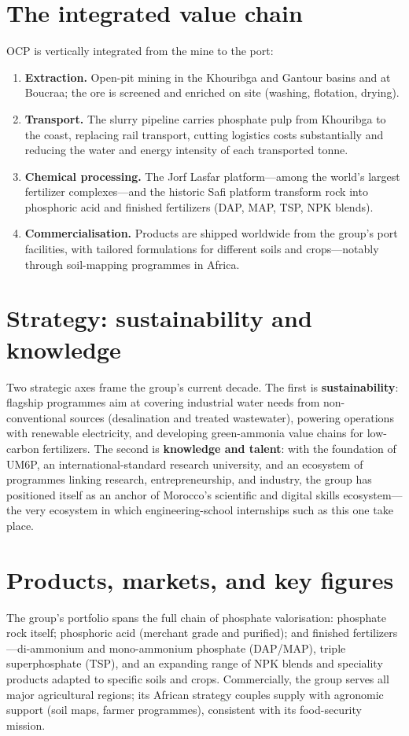 \documentclass[11pt,a4paper]{report}
\begin{document}
\section{The integrated value chain}
OCP is vertically integrated from the mine to the port:
\begin{enumerate}[nosep,leftmargin=1.6em]
  \item \textbf{Extraction.} Open-pit mining in the Khouribga and Gantour
  basins and at Boucraa; the ore is screened and enriched on site
  (washing, flotation, drying).
  \item \textbf{Transport.} The slurry pipeline carries phosphate pulp from
  Khouribga to the coast, replacing rail transport, cutting logistics costs
  substantially and reducing the water and energy intensity of each
  transported tonne.
  \item \textbf{Chemical processing.} The Jorf Lasfar platform---among the
  world's largest fertilizer complexes---and the historic Safi platform
  transform rock into phosphoric acid and finished fertilizers (DAP, MAP,
  TSP, NPK blends).
  \item \textbf{Commercialisation.} Products are shipped worldwide from the
  group's port facilities, with tailored formulations for different soils
  and crops---notably through soil-mapping programmes in Africa.
\end{enumerate}

\section{Strategy: sustainability and knowledge}
Two strategic axes frame the group's current decade. The first is
\textbf{sustainability}: flagship programmes aim at covering industrial
water needs from non-conventional sources (desalination and treated
wastewater), powering operations with renewable electricity, and developing
green-ammonia value chains for low-carbon fertilizers. The second is
\textbf{knowledge and talent}: with the foundation of UM6P, an
international-standard research university, and an ecosystem of programmes
linking research, entrepreneurship, and industry, the group has positioned
itself as an anchor of Morocco's scientific and digital skills
ecosystem---the very ecosystem in which engineering-school internships such
as this one take place.

\section{Products, markets, and key figures}
The group's portfolio spans the full chain of phosphate valorisation:
phosphate rock itself; phosphoric acid (merchant grade and purified);
and finished fertilizers---di-ammonium and mono-ammonium phosphate
(DAP/MAP), triple superphosphate (TSP), and an expanding range of NPK
blends and speciality products adapted to specific soils and crops.
Commercially, the group serves all major agricultural regions; its African
strategy couples supply with agronomic support (soil maps, farmer
programmes), consistent with its food-security mission.
\end{document}
